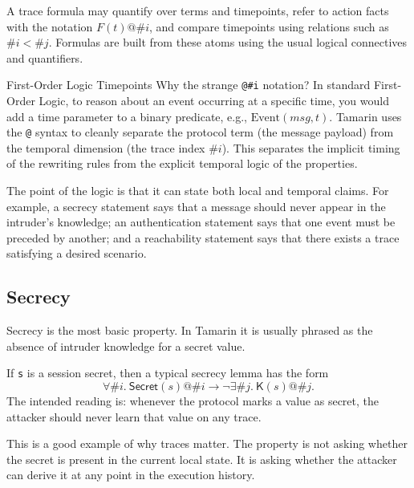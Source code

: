 \begin{definition}
\label{def:tamarin-formula}
A trace formula may quantify over terms and timepoints, refer to action facts
with the notation $F(t)@\#i$, and compare timepoints using relations such as
$\#i < \#j$.  Formulas are built from these atoms using the usual logical
connectives and quantifiers.
\end{definition}

\begin{intermezzo}{First-Order Logic Timepoints}
Why the strange \texttt{@\#i} notation? In standard First-Order Logic, to reason about an event occurring at a specific time, you would add a time parameter to a binary predicate, e.g., $\text{Event}(msg, t)$. Tamarin uses the \texttt{@} syntax to cleanly separate the protocol term (the message payload) from the temporal dimension (the trace index $\#i$). This separates the implicit timing of the rewriting rules from the explicit temporal logic of the properties.
\end{intermezzo}

The point of the logic is that it can state both local and temporal claims.
For example, a secrecy statement says that a message should never appear in
the intruder's knowledge; an authentication statement says that one event must
be preceded by another; and a reachability statement says that there exists a
trace satisfying a desired scenario.

\subsection{Secrecy}

Secrecy is the most basic property.  In Tamarin it is usually phrased as the
absence of intruder knowledge for a secret value.

\begin{example}
If \texttt{s} is a session secret, then a typical secrecy lemma has the form
\[
  \forall \#i.\ \mathsf{Secret}(s)@\#i \rightarrow \neg \exists \#j.\ \mathsf{K}(s)@\#j.
\]
The intended reading is: whenever the protocol marks a value as secret, the
attacker should never learn that value on any trace.
\end{example}

This is a good example of why traces matter.  The property is not asking
whether the secret is present in the current local state.  It is asking
whether the attacker can derive it at any point in the execution history.

